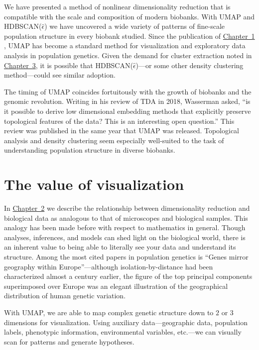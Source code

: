 We have presented a method of nonlinear dimensionality reduction that is compatible with the scale and composition of modern biobanks. With UMAP and HDBSCAN($\hat{\epsilon}$) we have uncovered a wide variety of patterns of fine-scale population structure in every biobank studied. Since the publication of \hyperref[chap:chapter1]{Chapter~1} , UMAP has become a standard method for visualization and exploratory data analysis in population genetics. Given the demand for cluster extraction noted in \hyperref[chap:chapter3]{Chapter~3}, it is possible that HDBSCAN($\hat{\epsilon}$)---or some other density clustering method---could see similar adoption.

The timing of UMAP coincides fortuitously with the growth of biobanks and the genomic revolution. Writing in his review of TDA in 2018, Wasserman asked, ``is it possible to derive low dimensional embedding methods that explicitly preserve topological features of the data? This is an interesting open question.''\citep{wasserman_topological_2018} This review was published in the same year that UMAP was released. Topological analysis and density clustering seem especially well-suited to the task of understanding population structure in diverse biobanks.

\section{The value of visualization}

In \hyperref[chap:chapter2]{Chapter~2} we describe the relationship between dimensionality reduction and biological data as analogous to that of microscopes and biological samples. This analogy has been made before with respect to mathematics in general\citep{cohen_mathematics_2004}. Though analyses, inferences, and models can shed light on the biological world, there is an inherent value to being able to literally see your data and understand its structure. Among the most cited papers in population genetics is ``Genes mirror geography within Europe''\citep{novembre2008europe}---although isolation-by-distance had been characterized almost a century earlier, the figure of the top principal components superimposed over Europe was an elegant illustration of the geographical distribution of human genetic variation.

With UMAP, we are able to map complex genetic structure down to $2$ or $3$ dimensions for visualization. Using auxiliary data---geographic data, population labels, phenotypic information, environmental variables, etc.---we can visually scan for patterns and generate hypotheses. 

